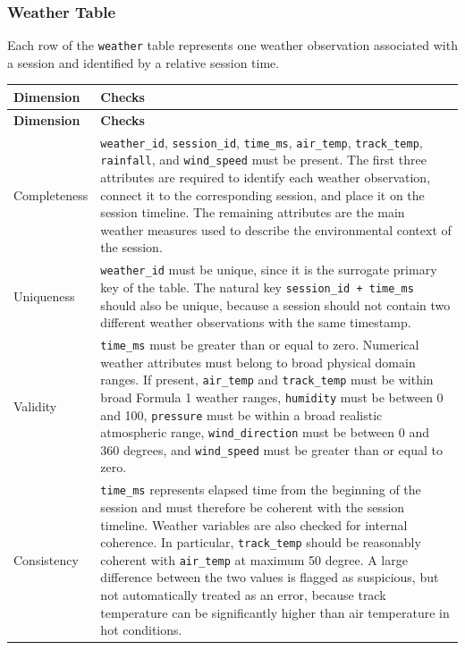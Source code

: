 \documentclass[a4paper,11pt]{article}
\begin{document}
	\subsubsection{Weather Table}
	
	Each row of the \texttt{weather} table represents one weather observation
	associated with a session and identified by a relative session time.
	
	
	\begin{longtable}{p{3.5cm}p{11cm}}
		\toprule
		\textbf{Dimension} & \textbf{Checks} \\
		\midrule
		\endfirsthead
		
		\toprule
		\textbf{Dimension} & \textbf{Checks} \\
		\midrule
		\endhead
		
		Completeness
		& \texttt{weather\_id}, \texttt{session\_id}, \texttt{time\_ms},
		\texttt{air\_temp}, \texttt{track\_temp}, \texttt{rainfall}, and
		\texttt{wind\_speed} must be present. The first three attributes are required
		to identify each weather observation, connect it to the corresponding session,
		and place it on the session timeline. The remaining attributes are the main
		weather measures used to describe the environmental context of the session. \\
		\midrule
		
		Uniqueness
		& \texttt{weather\_id} must be unique, since it is the surrogate primary key
		of the table. The natural key \texttt{session\_id + time\_ms} should also be
		unique, because a session should not contain two different weather observations
		with the same timestamp. \\
		\midrule
		
		Validity
		& \texttt{time\_ms} must be greater than or equal to zero. Numerical weather
		attributes must belong to broad physical domain ranges. If present,
		\texttt{air\_temp} and \texttt{track\_temp} must be within broad Formula 1
		weather ranges, \texttt{humidity} must be between 0 and 100,
		\texttt{pressure} must be within a broad realistic atmospheric range,
		\texttt{wind\_direction} must be between 0 and 360 degrees, and
		\texttt{wind\_speed} must be greater than or equal to zero. \\
		\midrule
		
		Consistency
		& \texttt{time\_ms} represents elapsed time from the beginning of the session
		and must therefore be coherent with the session timeline. Weather variables are
		also checked for internal coherence. In particular, \texttt{track\_temp} should
		be reasonably coherent with \texttt{air\_temp} at maximum 50 degree. A large difference between the
		two values is flagged as suspicious, but not automatically treated as an error,
		because track temperature can be significantly higher than air temperature in
		hot conditions. \\
		\midrule
		

\end{longtable}
\end{document}

